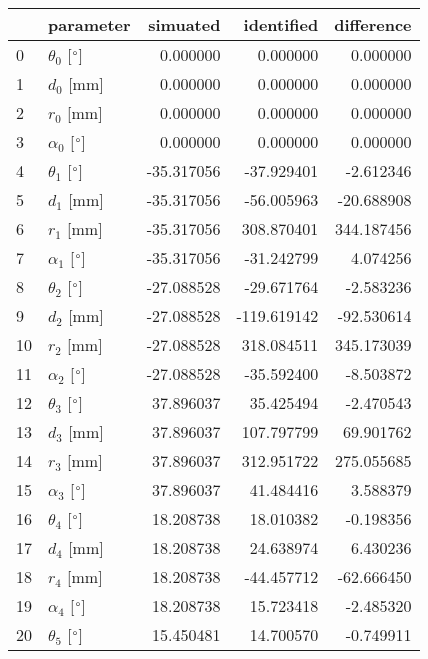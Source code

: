 \documentclass{standalone}%
\begin{document}
%
\normalsize%
\begin{tabular}{llrrr}
\toprule
{} &                 parameter &   simuated &  identified &  difference \\
\midrule
0  &  $\theta_{0}$ [$\degree$] &   0.000000 &    0.000000 &    0.000000 \\
1  &              $d_{0}$ [mm] &   0.000000 &    0.000000 &    0.000000 \\
2  &              $r_{0}$ [mm] &   0.000000 &    0.000000 &    0.000000 \\
3  &  $\alpha_{0}$ [$\degree$] &   0.000000 &    0.000000 &    0.000000 \\
4  &  $\theta_{1}$ [$\degree$] & -35.317056 &  -37.929401 &   -2.612346 \\
5  &              $d_{1}$ [mm] & -35.317056 &  -56.005963 &  -20.688908 \\
6  &              $r_{1}$ [mm] & -35.317056 &  308.870401 &  344.187456 \\
7  &  $\alpha_{1}$ [$\degree$] & -35.317056 &  -31.242799 &    4.074256 \\
8  &  $\theta_{2}$ [$\degree$] & -27.088528 &  -29.671764 &   -2.583236 \\
9  &              $d_{2}$ [mm] & -27.088528 & -119.619142 &  -92.530614 \\
10 &              $r_{2}$ [mm] & -27.088528 &  318.084511 &  345.173039 \\
11 &  $\alpha_{2}$ [$\degree$] & -27.088528 &  -35.592400 &   -8.503872 \\
12 &  $\theta_{3}$ [$\degree$] &  37.896037 &   35.425494 &   -2.470543 \\
13 &              $d_{3}$ [mm] &  37.896037 &  107.797799 &   69.901762 \\
14 &              $r_{3}$ [mm] &  37.896037 &  312.951722 &  275.055685 \\
15 &  $\alpha_{3}$ [$\degree$] &  37.896037 &   41.484416 &    3.588379 \\
16 &  $\theta_{4}$ [$\degree$] &  18.208738 &   18.010382 &   -0.198356 \\
17 &              $d_{4}$ [mm] &  18.208738 &   24.638974 &    6.430236 \\
18 &              $r_{4}$ [mm] &  18.208738 &  -44.457712 &  -62.666450 \\
19 &  $\alpha_{4}$ [$\degree$] &  18.208738 &   15.723418 &   -2.485320 \\
20 &  $\theta_{5}$ [$\degree$] &  15.450481 &   14.700570 &   -0.749911 \\

\end{tabular}
\end{document}
